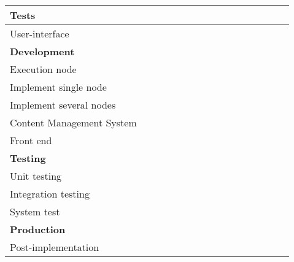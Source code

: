 \begin{table}
\begin{tabular}{|l|l|l|l|l|l|l|l|l|l|l|l|l|l|l|l|}
\hline
Tests &&&\cellcolor{RoyalBlue}&\cellcolor{RoyalBlue}&\cellcolor{RoyalBlue}&\cellcolor{RoyalBlue}&&&&&&&&&  \\
\hline
User-interface&&&&&\cellcolor{MidnightBlue}&\cellcolor{MidnightBlue}&\cellcolor{MidnightBlue}&\cellcolor{MidnightBlue}&\cellcolor{MidnightBlue}&&&&&&  \\
\hline
\textbf{Development}&&&&\cellcolor{Purple}&\cellcolor{Purple}&\cellcolor{Purple}&\cellcolor{Purple}&\cellcolor{Purple}&\cellcolor{Purple}&\cellcolor{Purple}&\cellcolor{Purple}&&&&  \\
\hline
Execution node&&&&&&&&\cellcolor{Orchid}&\cellcolor{Orchid}&\cellcolor{Orchid}&\cellcolor{Orchid}&&&&  \\
\hline
Implement single node&&&&&&&&\cellcolor{Thistle}&\cellcolor{Thistle}&\cellcolor{Thistle}&&&&&  \\
\hline
Implement several nodes&&&&&&&&&\cellcolor{Thistle}&\cellcolor{Thistle}&&&&&  \\
\hline
Content Management System&&&&&&&&&&&\cellcolor{Orchid}&&&&  \\
\hline
Front end&&&&\cellcolor{Orchid}&\cellcolor{Orchid}&\cellcolor{Orchid}&\cellcolor{Orchid}&\cellcolor{Orchid}&\cellcolor{Orchid}&\cellcolor{Orchid}&\cellcolor{Orchid}&&&&  \\
\hline
\textbf{Testing}&&&&&&&\cellcolor{Red}&\cellcolor{Red}&\cellcolor{Red}&\cellcolor{Red}&\cellcolor{Red}&\cellcolor{Red}&\cellcolor{Red}&\cellcolor{Red}&\cellcolor{Red}  \\
\hline
Unit testing &&&&&&&\cellcolor{Orchid}&\cellcolor{Orchid}&\cellcolor{Orchid}&\cellcolor{Orchid}&\cellcolor{Orchid}&\cellcolor{Orchid}&\cellcolor{Orchid}&\cellcolor{Orchid}&\cellcolor{Orchid}  \\
\hline
Integration testing&&&&&&&&&\cellcolor{Melon}&\cellcolor{Melon}&\cellcolor{Melon}&\cellcolor{Melon}&\cellcolor{Melon}&\cellcolor{Melon}&\cellcolor{Melon}  \\
\hline
System test&&&&&&&&&\cellcolor{Melon}&\cellcolor{Melon}&\cellcolor{Melon}&\cellcolor{Melon}&\cellcolor{Melon}&\cellcolor{Melon}&\cellcolor{Melon}  \\
\hline
\textbf{Production}&&&&&&&&&&&&&&\cellcolor{MidnightBlue}&\cellcolor{MidnightBlue}  \\
\hline
Post-implementation&&&&&&&&&&&&&&&\cellcolor{Plum} \\
\hline
\end{tabular}\label{gantt}
\end{table}

